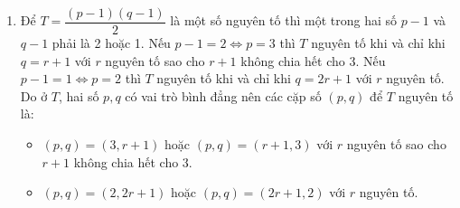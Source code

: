 \begin{vn}
{\begin{enumerate}
			Từ $ (1) $ và $ (2) $ suy ra
			$$ T=\dfrac{p(q-1)}{2}-\dfrac{q-1}{2}=\dfrac{(p-1)(q-1)}{2}. $$
			\item Để $ T= \dfrac{(p-1)(q-1)}{2}$ là một số nguyên tố thì một trong hai số $ p-1 $ và $ q-1 $ phải là 2 hoặc 1.
			Nếu $ p-1=2 \Leftrightarrow p=3$ thì $ T $ nguyên tố khi và chỉ khi $ q=r+1 $ với $ r $ nguyên tố sao cho $ r+1 $ không chia hết cho 3.
			Nếu $ p-1=1 \Leftrightarrow p=2$ thì $ T $ nguyên tố khi và chỉ khi $ q=2r+1 $ với $ r $ nguyên tố.
			Do ở $ T $, hai số $ p,q $ có vai trò bình đẳng nên các cặp số $ (p,q) $ để $ T $ nguyên tố là:
			\begin{itemize}
				\item $ (p,q) =(3,r+1)$ hoặc $ (p,q)=(r+1,3) $ với $ r $ nguyên tố sao cho $ r+1 $ không chia hết cho 3.
				\item $ (p,q) =(2,2r+1)$ hoặc $ (p,q)=(2r+1,2) $ với $ r $ nguyên tố.
			\end{itemize}
		\end{enumerate}
	}
\end{vn}

